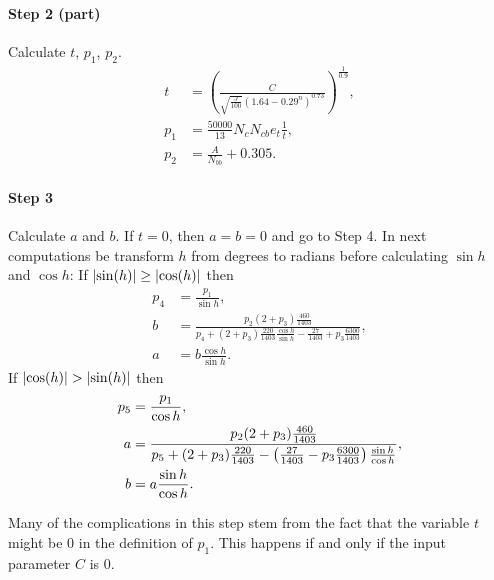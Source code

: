 \documentclass[twocolumn]{scrartcl}
\DeclarePairedDelimiter\abs{\lvert}{\rvert}%
\begin{document}
\paragraph{Step 2 (part)}{Calculate $t$, $p_1$, $p_2$.
\begin{align*}
  t &= {\left(\frac{C}{\sqrt{\frac{J}{100}} {(1.64 - 0.29^n)}^{0.73}}\right)}^\frac{1}{0.9},\\
  p_1 &= \frac{50000}{13} N_c N_{cb} e_t \frac{1}{t},\\
  p_2 &= \frac{A}{N_{bb}} + 0.305.
\end{align*}}

\paragraph{Step 3}{Calculate $a$ and $b$.
If $t=0$, then $a=b=0$ and go to Step 4.
In next computations be transform $h$ from degrees to radians
before calculating $\sin h$ and $\cos h$:
If $\abs{\sin(h)} \ge \abs{\cos(h)}$ then
\begin{align*}
  p_4 &= \frac{p_1}{\sin h},\\
  b &= \frac{p_2 (2+p_3) \frac{460}{1403}}{p_4 + (2+p_3) \frac{220}{1403} \frac{\cos h}{\sin h} - \frac{27}{1403} + p_3 \frac{6300}{1403}},\\
  a &= b \frac{\cos h}{\sin h}.
\end{align*}
If $\abs{\cos(h)} > \abs{\sin(h)}$ then
\begin{align*}
  p_5 &= \frac{p_1}{\cos h},\\
  a &= \frac{p_2 (2+p_3) \frac{460}{1403}}{%
    p_5
    + (2+p_3) \frac{220}{1403} -
    \left(\frac{27}{1403}  - p_3 \frac{6300}{1403}\right) \frac{\sin h}{\cos h}
  },\\
  b &= a \frac{\sin h}{\cos h}.
\end{align*}
}

Many of the complications in this step stem from the fact that the variable $t$
might be $0$ in the definition of $p_1$. This happens if and only if the input
parameter $C$ is $0$.
\end{document}
